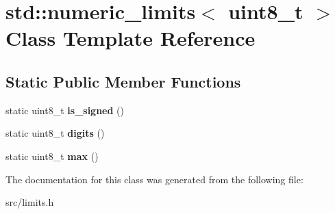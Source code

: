 \hypertarget{classstd_1_1numeric__limits_3_01uint8__t_01_4}{}\section{std\+:\+:numeric\+\_\+limits$<$ uint8\+\_\+t $>$ Class Template Reference}
\label{classstd_1_1numeric__limits_3_01uint8__t_01_4}
\subsection*{Static Public Member Functions}
\begin{DoxyCompactItemize}
\item 
\hypertarget{classstd_1_1numeric__limits_3_01uint8__t_01_4_adcbd633b68edddbf4197919ab60bb9fd}{}\label{classstd_1_1numeric__limits_3_01uint8__t_01_4_adcbd633b68edddbf4197919ab60bb9fd} 
static uint8\+\_\+t {\bfseries is\+\_\+signed} ()
\item 
\hypertarget{classstd_1_1numeric__limits_3_01uint8__t_01_4_a60652abaf60fe4ad2b9634e0281d9468}{}\label{classstd_1_1numeric__limits_3_01uint8__t_01_4_a60652abaf60fe4ad2b9634e0281d9468} 
static uint8\+\_\+t {\bfseries digits} ()
\item 
\hypertarget{classstd_1_1numeric__limits_3_01uint8__t_01_4_a08e857684300f5f5d5e973e40af90a5d}{}\label{classstd_1_1numeric__limits_3_01uint8__t_01_4_a08e857684300f5f5d5e973e40af90a5d} 
static uint8\+\_\+t {\bfseries max} ()
\end{DoxyCompactItemize}


The documentation for this class was generated from the following file\+:\begin{DoxyCompactItemize}
\item 
src/limits.\+h\end{DoxyCompactItemize}
